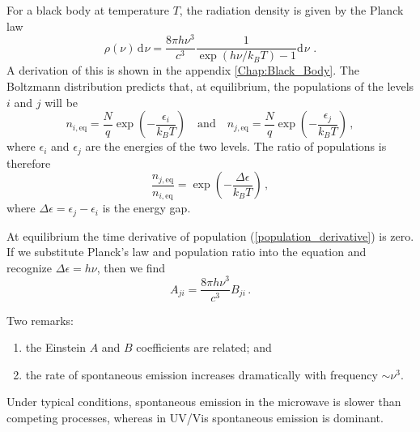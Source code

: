 \documentclass{article}
\theoremstyle{plain}\theoremheaderfont{\normalfont\itshape}\theorembodyfont{\rmfamily}\theoremseparator{.}\newtheorem*{rem}{Remark}\newtheorem*{ex}{Example}\newtheorem*{proof}{Proof}\newtheorem*{altp}{Alternative proof}
\theoremstyle{plain}\theoremheaderfont{\normalfont\bfseries}\theorembodyfont{\rmfamily}\theoremseparator{.}\newtheorem{thm}{Theorem}[section]\newtheorem{lem}[thm]{Lemma}\newtheorem{prop}[thm]{Proposition}\newtheorem*{cor}{Corollary}\newtheorem{defn}[thm]{Definition}\newtheorem{clm}[thm]{Claim}\newtheorem{clminproof}{Claim}\newtheorem{pos}{Postulate}[section]
\theoremstyle{break}\theoremheaderfont{\normalfont\itshape}\theorembodyfont{\rmfamily}\theoremseparator{.\medskip}\newtheorem*{proofskip}{Proof}\newtheorem*{exs}{Examples}\newtheorem*{rems}{Remarks}
\theoremstyle{break}\theoremheaderfont{\normalfont\bfseries}\theorembodyfont{\rmfamily}\theoremseparator{.\medskip}\newtheorem{lemskip}[thm]{Lemma}\newtheorem{defnskip}[thm]{Definition}\newtheorem{propskip}[thm]{Proposition}\newtheorem{thmskip}[thm]{Theorem}
\numberwithin{equation}{section}
\newcommand{\dd}[2][]{\mathrm{d}^{#1} #2\,}
\renewcommand{\d}[2][]{\,\mathrm{d}^{#1} #2}
\begin{document}
    For a black body at temperature \(T\), the radiation density is given by the Planck law
    \begin{equation}
        \rho(\nu)\d{\nu}=\frac{8\pi h\nu^3}{c^3}\frac{1}{\exp(h\nu/k_B T)-1}\dd{\nu}\,.
    \end{equation}
    A derivation of this is shown in the appendix \cref{Chap:Black_Body}. The Boltzmann distribution predicts that, at equilibrium, the populations of the levels \(i\) and \(j\) will be
    \begin{equation}
        n_{i,\text{eq}}=\frac{N}{q}\exp\left(-\frac{\epsilon_i}{k_BT}\right)\quad \text{and}\quad n_{j,\text{eq}}=\frac{N}{q}\exp\left(-\frac{\epsilon_j}{k_BT}\right)\,,
    \end{equation}
    where \(\epsilon_i\) and \(\epsilon_j\) are the energies of the two levels. The ratio of populations is therefore
    \begin{equation}
        \frac{n_{j,\text{eq}}}{n_{i,\text{eq}}}=\exp\left(-\frac{\Delta\epsilon}{k_B T}\right)\,,
    \end{equation}
    where \(\Delta\epsilon=\epsilon_j-\epsilon_i\) is the energy gap.

    At equilibrium the time derivative of population (\ref{population_derivative}) is zero. If we substitute Planck's law and population ratio into the equation and recognize \(\Delta\epsilon=h\nu\), then we find
    \begin{equation}
        A_{ji}=\frac{8\pi h\nu^3}{c^3}B_{ji}\,.
    \end{equation}

    Two remarks:
    \begin{enumerate}[topsep=0pt,label=(\roman*)]
        \item the Einstein \(A\) and \(B\) coefficients are related; and
        \item the rate of spontaneous emission increases dramatically with frequency \(\sim \nu^3\).
    \end{enumerate}

    Under typical conditions, spontaneous emission in the microwave is slower than competing processes, whereas in UV/Vis spontaneous emission is dominant.
\end{document}
